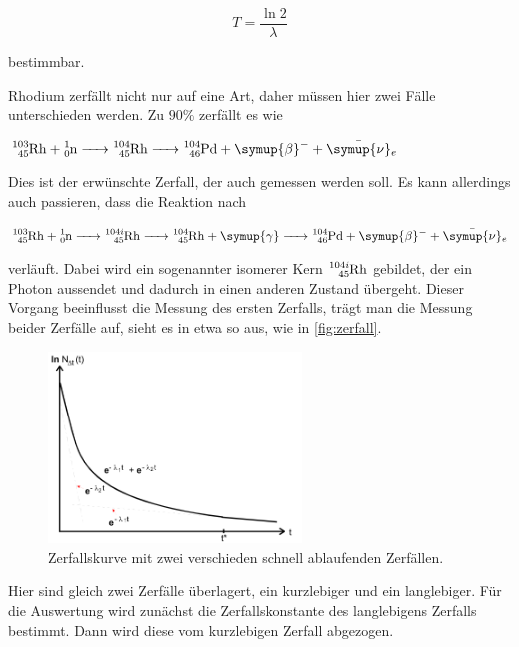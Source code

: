 \begin{equation}
    T = \frac{\ln{2}}{\lambda}
    \label{eq:lambda}
\end{equation}

bestimmbar.



Rhodium zerfällt nicht nur auf eine Art, daher müssen hier zwei Fälle unterschieden werden.
Zu $90\%$ zerfällt es wie

$\ce{^{103}_{45}Rh + ^{1}_0n -> ^{104}_{45}Rh -> ^{104}_{46}Pd + \symup{\beta}- + \bar{\symup{\nu}}_e}$

Dies ist der erwünschte Zerfall, der auch gemessen werden soll.
Es kann allerdings auch passieren, dass die Reaktion nach

$\ce{^{103}_{45}Rh + ^{1}_0n -> ^{104i}_{45}Rh -> ^{104}_{45}Rh + \symup{\gamma} -> ^{104}_{46}Pd + \symup{\beta}- + \bar{\symup{\nu}}_e}$

verläuft.
Dabei wird ein sogenannter isomerer Kern $\ce{^{104i}_{45}Rh}$ gebildet, der ein Photon aussendet und dadurch in einen anderen Zustand übergeht. 
Dieser Vorgang beeinflusst die Messung des ersten Zerfalls, trägt man die Messung beider Zerfälle auf, sieht es in etwa so aus, wie in \autoref{fig:zerfall}.

\begin{figure}
    \centering
    \includegraphics[width=0.6\textwidth]{images/bild2.png}
    \caption{Zerfallskurve mit zwei verschieden schnell ablaufenden Zerfällen.\cite{V702}}
    \label{fig:zerfall}
\end{figure}

Hier sind gleich zwei Zerfälle überlagert, ein kurzlebiger und ein langlebiger.
Für die Auswertung wird zunächst die Zerfallskonstante des langlebigens Zerfalls bestimmt.
Dann wird diese vom kurzlebigen Zerfall abgezogen.